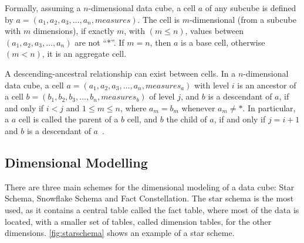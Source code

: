 Formally, assuming a $n$-dimensional data cube, a cell $a$ of any subcube is defined by $a = (a_1, a_2, a_3, \ldots, a_n, measures)$.
The cell is $m$-dimensional (from a subcube with $m$ dimensions), if exactly $m$, with $(m \leq n)$, values between $(a_1, a_2, a_3, \ldots, a_n)$ are not ``$*$''.
If $m = n$, then $a$ is a base cell, otherwise $(m < n)$, it is an aggregate cell.

A descending-ancestral relationship can exist between cells.
In a $n$-dimensional data cube, a cell $a = (a_1, a_2, a_3, \ldots, a_n, measures_a)$ with level $i$ is an ancestor of a cell $b = (b_1, b_2, b_3, \ldots, b_n, measures_b)$ of level $j$, and $b$ is a descendant of $a$, if and only if $i < j$ and $1 \leq m \leq n$, where $a_m = b_m$ whenever $a_m \neq *$.
In particular, a $a$ cell is called the parent of a $b$ cell, and $b$ the child of $a$, if and only if $j = i+1$ and $b$ is a descendant of $a$~\cite{hanDataMiningConcepts2011}.

\subsection{Dimensional Modelling}\label{ch:fun:cube:dimm}

There are three main schemes for the dimensional modeling of a data cube: Star Schema, Snowflake Schema and Fact Constellation.
The star schema is the most used, as it contains a central table called the fact table, where most of the data is located, with a smaller set of tables, called dimension tables, for the other dimensions.
\autoref{fig:starschema} shows an example of a star scheme.

